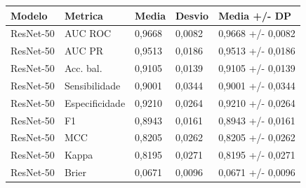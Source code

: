 \begin{tabular}{lllll}
\toprule
Modelo & Metrica & Media & Desvio & Media +/- DP \\
\midrule
ResNet-50 & AUC ROC & 0,9668 & 0,0082 & 0,9668 +/- 0,0082 \\
ResNet-50 & AUC PR & 0,9513 & 0,0186 & 0,9513 +/- 0,0186 \\
ResNet-50 & Acc. bal. & 0,9105 & 0,0139 & 0,9105 +/- 0,0139 \\
ResNet-50 & Sensibilidade & 0,9001 & 0,0344 & 0,9001 +/- 0,0344 \\
ResNet-50 & Especificidade & 0,9210 & 0,0264 & 0,9210 +/- 0,0264 \\
ResNet-50 & F1 & 0,8943 & 0,0161 & 0,8943 +/- 0,0161 \\
ResNet-50 & MCC & 0,8205 & 0,0262 & 0,8205 +/- 0,0262 \\
ResNet-50 & Kappa & 0,8195 & 0,0271 & 0,8195 +/- 0,0271 \\
ResNet-50 & Brier & 0,0671 & 0,0096 & 0,0671 +/- 0,0096 \\
\bottomrule
\end{tabular}

